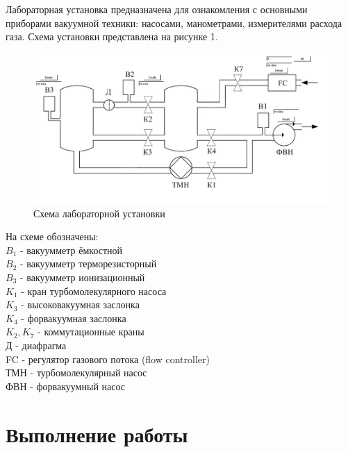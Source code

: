 \documentclass{article}
\begin{document}
Лабораторная установка предназначена для ознакомления с основными приборами вакуумной техники: насосами, манометрами, измерителями расхода газа. Схема установки представлена на рисунке 1.
\begin{figure}[h]
    \centering
    \includegraphics[width=\textwidth]{facility.PNG}
    \caption{Схема лабораторной установки}
    \label{fig:vac}
\end{figure}

На схеме обозначены: \\
$B_1$ - вакуумметр ёмкостной\\
$B_2$ - вакуумметр терморезисторный\\
$B_3$ - вакуумметр ионизационный\\
$K_1$ - кран турбомолекулярного насоса\\
$K_3$ - высоковакуумная заслонка\\
$K_4$ - форвакуумная заслонка\\
$K_2, K_7$ - коммутационные краны\\
Д - диафрагма\\
FC - регулятор газового потока (flow controller)\\
ТМН - турбомолекулярный насос\\
ФВН - форвакуумный насос\\

\section{Выполнение работы}
\end{document}
